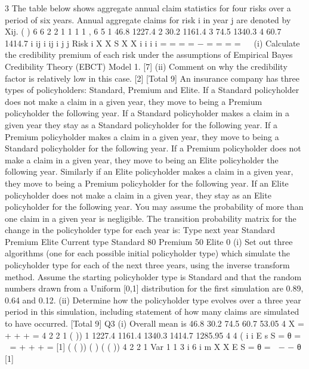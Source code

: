 \documentclass[]{report}
\begin{document}
3 The table below shows aggregate annual claim statistics for four risks over a period of
six years. Annual aggregate claims for risk i in year j are denoted by Xij.
( ) 6 6 2 2
1 1
1 1 ,
6 5
1 46.8 1227.4
2 30.2 1161.4
3 74.5 1340.3
4 60.7 1414.7
i ij i ij i
j j
Risk i X X S X X
i
i
i
i
= =
  = = −
=
  =
  =
  =
   
(i) Calculate the credibility premium of each risk under the assumptions of
Empirical Bayes Credibility Theory (EBCT) Model 1. [7]
(ii) Comment on why the credibility factor is relatively low in this case. [2]
[Total 9]
An insurance company has three types of policyholders: Standard, Premium and Elite.
If a Standard policyholder does not make a claim in a given year, they move to being
a Premium policyholder the following year. If a Standard policyholder makes a claim
in a given year they stay as a Standard policyholder for the following year.
If a Premium policyholder makes a claim in a given year, they move to being a
Standard policyholder for the following year. If a Premium policyholder does not
make a claim in a given year, they move to being an Elite policyholder the following
year.
Similarly if an Elite policyholder makes a claim in a given year, they move to being a
Premium policyholder for the following year. If an Elite policyholder does not make
a claim in a given year, they stay as an Elite policyholder for the following year.
You may assume the probability of more than one claim in a given year is negligible.
The transition probability matrix for the change in the policyholder type for each year
is:
  Type next year
Standard Premium Elite
Current type
Standard 80%
Premium 50%
Elite 0%
(i) Set out three algorithms (one for each possible initial policyholder type) which
simulate the policyholder type for each of the next three years, using the
inverse transform method. 
Assume the starting policyholder type is Standard and that the random numbers drawn
from a Uniform [0,1] distribution for the first simulation are 0.89, 0.64 and 0.12.
(ii) Determine how the policyholder type evolves over a three year period in this
simulation, including statement of how many claims are simulated to have
occurred. 
[Total 9]
\newpage
Q3 (i) Overall mean is 46.8 30.2 74.5 60.7 53.05
4
X = + + + = 
4
2 2
1
( )) 1 1227.4 1161.4 1340.3 1414.7 1285.95
4 4
( i
  i
  E s S
  =
    θ =  = + + + = [1]
  ( ( )) ( ) ( ( )) 4 2 2
  1
  Var 1 1
  3 i 6
  i
  m X X E S
  =
    θ =  − − θ [1]
\end{document}
